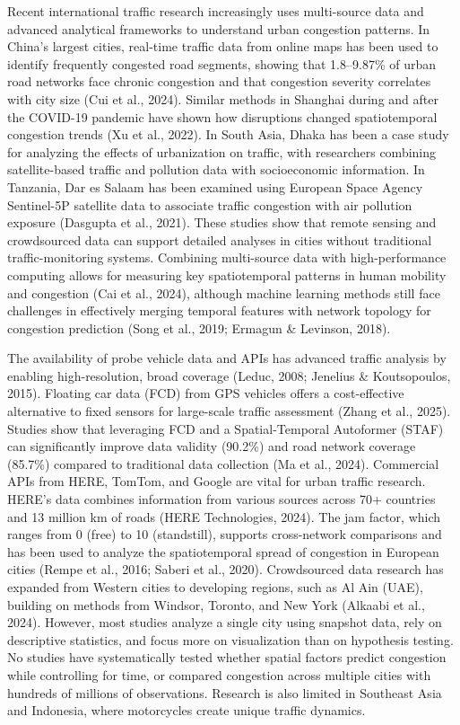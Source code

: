 \documentclass[12pt,a4paper]{article}
\begin{document}
Recent international traffic research increasingly uses multi-source data and advanced analytical frameworks to understand urban congestion patterns. In China's largest cities, real-time traffic data from online maps has been used to identify frequently congested road segments, showing that 1.8–9.87\% of urban road networks face chronic congestion and that congestion severity correlates with city size (Cui et al., 2024). Similar methods in Shanghai during and after the COVID-19 pandemic have shown how disruptions changed spatiotemporal congestion trends (Xu et al., 2022). In South Asia, Dhaka has been a case study for analyzing the effects of urbanization on traffic, with researchers combining satellite-based traffic and pollution data with socioeconomic information. In Tanzania, Dar es Salaam has been examined using European Space Agency Sentinel-5P satellite data to associate traffic congestion with air pollution exposure (Dasgupta et al., 2021). These studies show that remote sensing and crowdsourced data can support detailed analyses in cities without traditional traffic-monitoring systems. Combining multi-source data with high-performance computing allows for measuring key spatiotemporal patterns in human mobility and congestion (Cai et al., 2024), although machine learning methods still face challenges in effectively merging temporal features with network topology for congestion prediction (Song et al., 2019; Ermagun \& Levinson, 2018).

The availability of probe vehicle data and APIs has advanced traffic analysis by enabling high-resolution, broad coverage (Leduc, 2008; Jenelius \& Koutsopoulos, 2015). Floating car data (FCD) from GPS vehicles offers a cost-effective alternative to fixed sensors for large-scale traffic assessment (Zhang et al., 2025). Studies show that leveraging FCD and a Spatial-Temporal Autoformer (STAF) can significantly improve data validity (90.2\%) and road network coverage (85.7\%) compared to traditional data collection (Ma et al., 2024). Commercial APIs from HERE, TomTom, and Google are vital for urban traffic research. HERE's data combines information from various sources across 70+ countries and 13 million km of roads (HERE Technologies, 2024). The jam factor, which ranges from 0 (free) to 10 (standstill), supports cross-network comparisons and has been used to analyze the spatiotemporal spread of congestion in European cities (Rempe et al., 2016; Saberi et al., 2020). Crowdsourced data research has expanded from Western cities to developing regions, such as Al Ain (UAE), building on methods from Windsor, Toronto, and New York (Alkaabi et al., 2024). However, most studies analyze a single city using snapshot data, rely on descriptive statistics, and focus more on visualization than on hypothesis testing. No studies have systematically tested whether spatial factors predict congestion while controlling for time, or compared congestion across multiple cities with hundreds of millions of observations. Research is also limited in Southeast Asia and Indonesia, where motorcycles create unique traffic dynamics.
\end{document}
